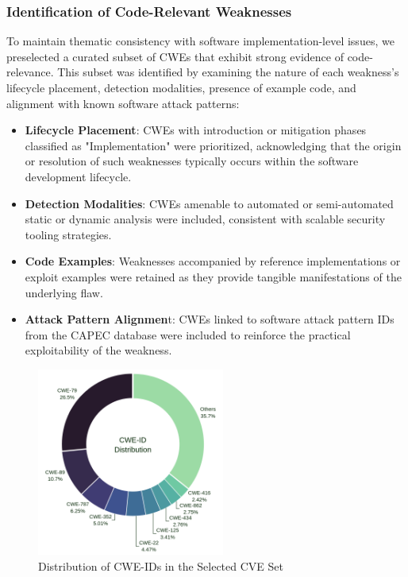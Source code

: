 \subsubsection{Identification of Code-Relevant Weaknesses}
To maintain thematic consistency with software implementation-level issues, we preselected a curated subset of \ac{CWE}s that exhibit strong evidence of code-relevance. This subset was identified by examining the nature of each weakness's lifecycle placement, detection modalities, presence of example code, and alignment with known software attack patterns:

\begin{itemize}
    \item \textbf{Lifecycle Placement}: CWEs with introduction or mitigation phases classified as "Implementation" were prioritized, acknowledging that the origin or resolution of such weaknesses typically occurs within the software development lifecycle.
    \item \textbf{Detection Modalities}: CWEs amenable to automated or semi-automated static or dynamic analysis were included, consistent with scalable security tooling strategies.
    \item \textbf{Code Examples}: Weaknesses accompanied by reference implementations or exploit examples were retained as they provide tangible manifestations of the underlying flaw.
    \item \textbf{Attack Pattern Alignmen}t: CWEs linked to software attack pattern IDs from the CAPEC database were included to reinforce the practical exploitability of the weakness.
\end{itemize}

\begin{figure}[!h]
	\centering
    \includegraphics[width=0.55\textwidth]{figures/chapter_2/cwe_distribution_donut.png}
	\caption{Distribution of CWE-IDs in the Selected CVE Set}
	\label{fig:cwe_distribution}
\end{figure}

